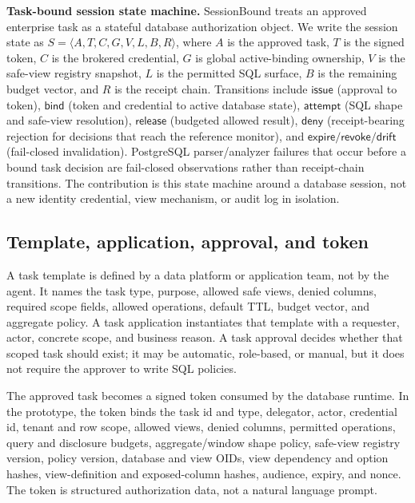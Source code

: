 \documentclass[journal]{IEEEtran}
\begin{document}
\noindent\textbf{Task-bound session state machine.}
SessionBound treats an approved enterprise task as a stateful database
authorization object. We write the session state as
\(S=\langle A,T,C,G,V,L,B,R\rangle\), where \(A\) is the approved task,
\(T\) is the signed token, \(C\) is the brokered credential, \(G\) is
global active-binding ownership, \(V\) is the safe-view registry
snapshot, \(L\) is the permitted SQL surface, \(B\) is the remaining
budget vector, and \(R\) is the receipt chain. Transitions include
\(\mathsf{issue}\) (approval to token), \(\mathsf{bind}\) (token and
credential to active database state), \(\mathsf{attempt}\) (SQL shape
and safe-view resolution), \(\mathsf{release}\) (budgeted allowed
result), \(\mathsf{deny}\) (receipt-bearing rejection for decisions that
reach the reference monitor), and \(\mathsf{expire/revoke/drift}\)
(fail-closed invalidation). PostgreSQL parser/analyzer failures that
occur before a bound task decision are fail-closed observations rather
than receipt-chain transitions. The contribution is this state machine
around a database session, not a new identity credential, view mechanism,
or audit log in isolation.

\hypertarget{template-application-approval-and-token}{%
\subsection{Template, application, approval, and token}\label{template-application-approval-and-token}}

A task template is defined by a data platform or application team, not by
the agent. It names the task type, purpose, allowed safe views, denied
columns, required scope fields, allowed operations, default TTL, budget
vector, and aggregate policy. A task application instantiates that
template with a requester, actor, concrete scope, and business reason. A
task approval decides whether that scoped task should exist; it may be
automatic, role-based, or manual, but it does not require the approver to
write SQL policies.

The approved task becomes a signed token consumed by the database
runtime. In the prototype, the token binds the task id and type,
delegator, actor, credential id, tenant and row scope, allowed views,
denied columns, permitted operations, query and disclosure budgets,
aggregate/window shape policy, safe-view registry version, policy
version, database and view OIDs, view dependency and option hashes,
view-definition and exposed-column hashes, audience, expiry, and nonce.
The token is structured authorization data, not a natural language prompt.
\end{document}
